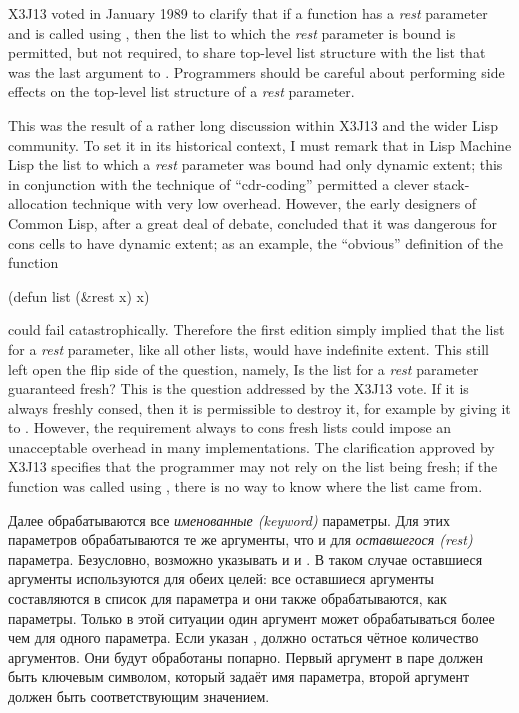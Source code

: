 \begin{new}
X3J13 voted in January 1989
to clarify that if a function has a \emph{rest} parameter
and is called using , then the list to which the
\emph{rest} parameter is bound is permitted, but not required,
to share top-level list structure with the list that was the last
argument to .  Programmers should be careful about performing
side effects on the top-level list structure of a \emph{rest} parameter.

This was the result of a rather long discussion within X3J13 and the
wider Lisp community.  To set it in its historical context, I must remark
that in Lisp Machine Lisp the list to which a \emph{rest} parameter was
bound had only dynamic extent; this in conjunction with the
technique of ``cdr-coding'' permitted a clever stack-allocation technique
with very low overhead.  However, the early designers of
Common Lisp, after a great deal of debate, concluded that it was dangerous
for cons cells to have dynamic extent; as an example, the ``obvious''
definition of the function 
\begin{lisp}
(defun list (\&rest x) x)
\end{lisp}
could fail catastrophically.  Therefore the first edition simply implied
that the list for a \emph{rest} parameter, like all other lists, would
have indefinite extent.  This still left open the flip side of the
question, namely, Is the list for a \emph{rest} parameter guaranteed fresh?
This is the question addressed by the X3J13 vote.
If it is always freshly consed, then it is permissible to destroy it,
for example by giving it to .  However, the requirement always
to cons fresh lists could impose an unacceptable overhead in many implementations.
The clarification approved by X3J13 specifies that the programmer may
not rely on the list being fresh; if the function was called using ,
there is no way to know where the list came from.
\end{new}

Далее обрабатываются все \emph{именованные (keyword)} параметры.
Для этих параметров обрабатываются те же аргументы, что и для
\emph{оставшегося (rest)} параметра.
Безусловно, возможно указывать и  и . В таком случае
оставшиеся аргументы используются для обеих целей:
все оставшиеся аргументы составляются в список для  параметра и они
также обрабатываются, как  параметры. Только в этой ситуации один
аргумент может обрабатываться более чем для одного параметра.
Если указан , должно остаться чётное количество аргументов. Они будут
обработаны попарно. Первый аргумент в паре должен быть ключевым символом,
который задаёт имя параметра, второй аргумент должен быть соответствующим
значением.

